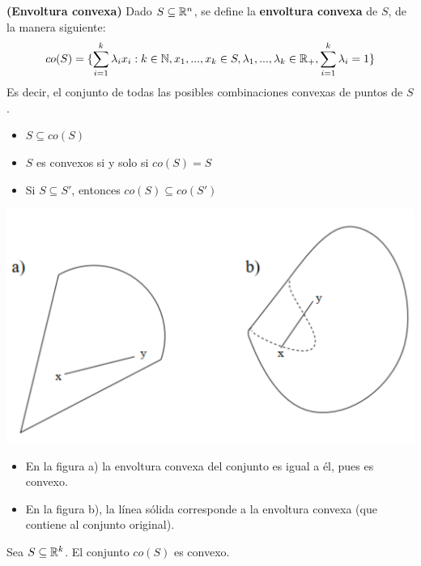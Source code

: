 \begin{definicion}
	\textbf{(Envoltura convexa)}
	Dado $S\subseteq \mathbb{R}^n$, se define la \textbf{envoltura convexa} de $S$, de la manera siguiente: 
	$$ co (S) = \{ \sum_{i=1}^{k}\lambda_i x_i : k \in \mathbb{N}, x_1, ... , x_k \in S, \lambda_1, ... , \lambda_k \in \mathbb{R}_+ , \sum_{i=1}^{k}\lambda_i = 1 \} $$
	Es decir, el conjunto de todas las posibles combinaciones convexas de puntos de $S$. 
\end{definicion}


\begin{nota}
	\begin{itemize}
		\item $S \subseteq co(S)$  
		\item $S$ es convexos si y solo si $co(S) = S$  
		\item Si $S \subseteq S'$, entonces $co(S) \subseteq co(S')$
	\end{itemize}
\end{nota}

\begin{center}
	\includegraphics[scale=0.4]{figuras/capitulo2/1.conjuntos-convexos/ej-envoltura-convexa.png}
\end{center}


\begin{itemize}
	\item En la figura a) la envoltura convexa del conjunto es igual a él, pues es convexo. 
	\item En la figura b), la línea sólida corresponde a la envoltura convexa (que contiene al conjunto original).
\end{itemize}


\begin{proposicion}
	Sea $S \subseteq \mathbb{R}^k$. El conjunto $co(S)$ es convexo. 
\end{proposicion}

